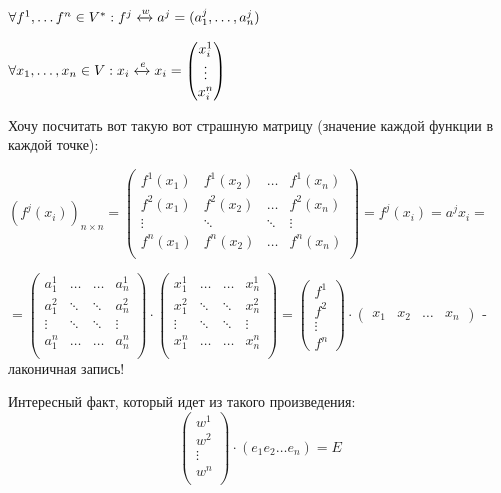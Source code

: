 $\forall f^1, \ldots f^n \in V^*: f^j \xleftrightarrow{w} a^j = (a_1^j,\ldots , a_n^j)$

$\forall x_1, \ldots, x_n \in V: x_i \xleftrightarrow{e}x_i = \begin{pmatrix}
    x^1_i \\
    \vdots \\ 
    x^n_i
\end{pmatrix}$

Хочу посчитать вот такую вот страшную матрицу (значение каждой функции в каждой точке):

$(f^j(x_i))_{n\times n} = \begin{pmatrix}
    f^1(x_1) & f^1(x_2) & \dots & f^1(x_n)\\
    f^2(x_1) & f^2(x_2) & \dots & f^2(x_n)\\
    \vdots & \ddots & \ddots & \vdots \\
    f^n(x_1) & f^n(x_2) & \dots & f^n(x_n)\\
\end{pmatrix} = f^j(x_i)= a^j x_i  = $


$=\begin{pmatrix}
    a_1^1 & \ldots & \ldots& a^1_n\\ 
     a_1^2 & \ddots & \ddots& a^2_n\\ 
      \vdots & \ddots & \ddots& \vdots\\ 
      a_1^n & \ldots & \ldots& a^n_n\\ 
\end{pmatrix} \cdot\begin{pmatrix}
    x_1^1 & \ldots & \ldots& x^1_n\\ 
     x_1^2 & \ddots & \ddots& x^2_n\\ 
      \vdots & \ddots & \ddots& \vdots\\ 
      x_1^n & \ldots & \ldots& x^n_n\\ 
\end{pmatrix} = \begin{pmatrix}
    f^1\\
    f^2\\
    \vdots\\
    f^n
\end{pmatrix} \cdot \begin{pmatrix}
    x_1 & x_2 & \ldots & x_n
\end{pmatrix}$ - лаконичная запись!



Интересный факт, который идет из такого произведения:
$$\begin{pmatrix}
    w^1 \\
    w^2 \\
    \vdots \\
    w^n \\
\end{pmatrix} \cdot (e_1e_2 \dots e_n) = E $$

